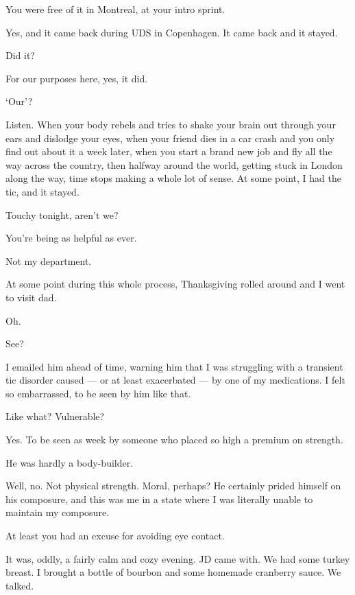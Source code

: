 \begin{paracol}{2}
\begin{leftcolumn}
\begin{ally}
You were free of it in Montreal, at your intro sprint.
\end{ally}
Yes, and it came back during UDS in Copenhagen. It came back and it stayed.

\begin{ally}
Did it?
\end{ally}
For our purposes here, yes, it did.

\begin{ally}
`Our'?
\end{ally}
Listen. When your body rebels and tries to shake your brain out through your ears and dislodge your eyes, when your friend dies in a car crash and you only find out about it a week later, when you start a brand new job and fly all the way across the country, then halfway around the world, getting stuck in London along the way, time stops making a whole lot of sense. At some point, I had the tic, and it stayed.

\begin{ally}
Touchy tonight, aren't we?
\end{ally}
You're being as helpful as ever.

\begin{ally}
Not my department.
\end{ally}
At some point during this whole process, Thanksgiving rolled around and I went to visit dad.

\begin{ally}
Oh.
\end{ally}
See?

I emailed him ahead of time, warning him that I was struggling with a transient tic disorder caused --- or at least exacerbated --- by one of my medications. I felt so embarrassed, to be seen by him like that.

\begin{ally}
Like what? Vulnerable?
\end{ally}
Yes. To be seen as week by someone who placed so high a premium on strength.

\begin{ally}
He was hardly a body-builder.
\end{ally}
Well, no. Not physical strength. Moral, perhaps? He certainly prided himself on his composure, and this was me in a state where I was literally unable to maintain my composure.

\begin{ally}
At least you had an excuse for avoiding eye contact.
\end{ally}
It was, oddly, a fairly calm and cozy evening. JD came with. We had some turkey breast. I brought a bottle of bourbon and some homemade cranberry sauce. We talked.


\end{leftcolumn}
\end{paracol}
